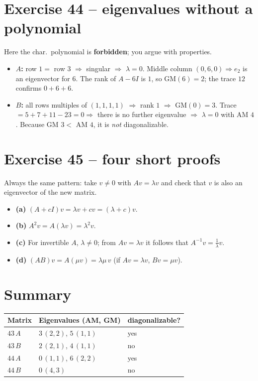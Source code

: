 \documentclass[a4paper,12pt]{article}
\begin{document}
\section*{Exercise 44 -- eigenvalues without a polynomial}

Here the char.\ polynomial is \textbf{forbidden}; you argue with properties.
\begin{itemize}[leftmargin=*, nosep]
    \item \textbf{$A$:} row $1 =$ row $3$ $\Rightarrow$ singular $\Rightarrow$ $\lambda = 0$. Middle column $(0,6,0) \Rightarrow e_2$ is an eigenvector for $6$. The rank of $A - 6I$ is $1$, so GM$(6) = 2$; the trace $12$ confirms $0 + 6 + 6$.
    \item \textbf{$B$:} all rows multiples of $(1,1,1,1)$ $\Rightarrow$ rank $1$ $\Rightarrow$ GM$(0) = 3$. Trace $= 5+7+11-23 = 0 \Rightarrow$ there is no further eigenvalue $\Rightarrow$ $\lambda = 0$ with AM $4$. Because GM $3 <$ AM $4$, it is \emph{not} diagonalizable.
\end{itemize}

\section*{Exercise 45 -- four short proofs}

Always the same pattern: take $v \neq 0$ with $Av = \lambda v$ and check that $v$ is also an eigenvector of the new matrix.
\begin{itemize}[leftmargin=*, nosep]
    \item \textbf{(a)} $(A + cI)v = \lambda v + cv = (\lambda + c)v$.
    \item \textbf{(b)} $A^2 v = A(\lambda v) = \lambda^2 v$.
    \item \textbf{(c)} For invertible $A$, $\lambda \neq 0$; from $Av = \lambda v$ it follows that $A^{-1}v = \tfrac1\lambda v$.
    \item \textbf{(d)} $(AB)v = A(\mu v) = \lambda\mu\, v$ (if $Av = \lambda v$, $Bv = \mu v$).
\end{itemize}

\section*{Summary}

\begin{center}
\begin{tabular}{@{}lll@{}}
\toprule
Matrix & Eigenvalues (AM, GM) & diagonalizable? \\
\midrule
$43\,A$ & $3\,(2,2)$, \; $5\,(1,1)$ & yes \\
$43\,B$ & $2\,(2,1)$, \; $4\,(1,1)$ & no \\
$44\,A$ & $0\,(1,1)$, \; $6\,(2,2)$ & yes \\
$44\,B$ & $0\,(4,3)$ & no \\
\bottomrule
\end{tabular}
\end{center}
\end{document}
